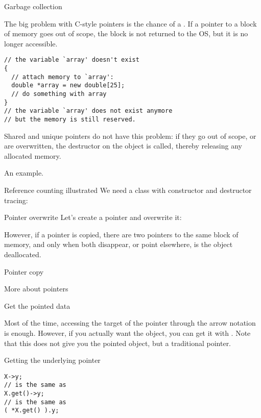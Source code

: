  {Garbage collection}

The big problem with C-style pointers is the chance of a
. If a pointer to a block of memory goes out of
scope, the block is not returned to the \ac{OS}, but it is no longer
accessible.
\begin{lstlisting}
// the variable `array' doesn't exist
{
  // attach memory to `array':
  double *array = new double[25];
  // do something with array
}
// the variable `array' does not exist anymore
// but the memory is still reserved.
\end{lstlisting}
Shared and unique
pointers do not have this problem: if they go out of scope, or are
overwritten, the destructor on the object is called, thereby releasing
any allocated memory.

An example.

\begin{block}{Reference counting illustrated}
  \label{sl:construct-destruct-trace}
  We need a class with constructor and destructor tracing:
\end{block}

\begin{block}{Pointer overwrite}
  \label{sl:shared-ptr-overwrite}
  Let's create a pointer and overwrite it:
\end{block}

However, if a pointer is copied, there are two pointers to the same
block of memory, and only when both disappear, or point elsewhere, is
the object deallocated.

\begin{block}{Pointer copy}
  \label{sl:shared-ptr-copy}
\end{block}

 {More about pointers}

 {Get the pointed data}

Most of the time, accessing the target of the pointer through the
arrow notation is enough. However, if you actually want the object,
you can get it with . Note that this does not give
you the pointed object, but a traditional pointer.

\begin{block}{Getting the underlying pointer}
  \label{sl:pointer-get}
\begin{lstlisting}
X->y;
// is the same as
X.get()->y;
// is the same as
( *X.get() ).y;
\end{lstlisting}

\end{block}


